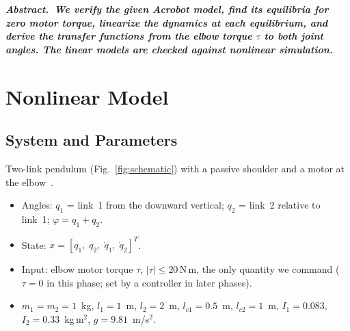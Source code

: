 \documentclass[10pt,twocolumn,letterpaper]{article}
\newcommand{\Nm}{\,\mathrm{N\,m}}
\begin{document}

{\footnotesize\bfseries\itshape Abstract.\/\upshape\ 
We verify the given Acrobot model, find its equilibria for zero motor torque, linearize the dynamics at each equilibrium, and derive the transfer functions from the elbow torque $\tau$ to both joint angles. The linear models are checked against nonlinear simulation.\par}

\section{Nonlinear Model}
\subsection{System and Parameters}
Two-link pendulum (Fig.~\ref{fig:schematic}) with a passive shoulder and a motor at the elbow~\cite{spong95,tedrake}.
\begin{itemize}
\item Angles: $q_1$ = link~1 from the downward vertical; $q_2$ = link~2 relative to link~1; $\varphi=q_1+q_2$.
\item State: $x=[q_1,\;q_2,\;\dot q_1,\;\dot q_2]^T$.
\item Input: elbow motor torque $\tau$, $|\tau|\le20\Nm$, the only quantity we command ($\tau=0$ in this phase; set by a controller in later phases).
\item $m_1=m_2=1$~kg, $l_1=1$~m, $l_2=2$~m, $l_{c1}=0.5$~m, $l_{c2}=1$~m, $I_1=0.083$, $I_2=0.33$~kg\,m$^2$, $g=9.81$~m/s$^2$.
\end{itemize}
\end{document}
